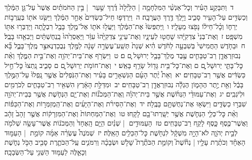 \documentclass[18pt]{article}
\newcommand{\kri}[1]{\Afootnote{#1}}	%
\begin{document}
 {\loc ד~}וַתִּבָּקַ֣ע הָעִ֗יר וְכׇל־אַנְשֵׁ֨י הַמִּלְחָמָ֤ה  |  הַלַּ֙יְלָה֙ דֶּ֜רֶךְ שַׁ֣עַר  |  בֵּ֣ין הַחֹמֹתַ֗יִם אֲשֶׁר֙ עַל־גַּ֣ן הַמֶּ֔לֶךְ וְכַשְׂדִּ֥ים עַל־הָעִ֖יר סָבִ֑יב וַיֵּ֖לֶךְ דֶּ֥רֶךְ הָעֲרָבָֽה׃ \startlock
 {\loc ה~}וַיִּרְדְּפ֤וּ חֵיל־כַּשְׂדִּים֙ אַחַ֣ר הַמֶּ֔לֶךְ וַיַּשִּׂ֥גוּ אֹת֖וֹ בְּעַֽרְב֣וֹת יְרֵח֑וֹ וְכׇ֨ל־חֵיל֔וֹ נָפֹ֖צוּ מֵעָלָֽיו׃ \startlock
 {\loc ו~}וַֽיִּתְפְּשׂוּ֙ אֶת־הַמֶּ֔לֶךְ וַיַּעֲל֥וּ אֹת֛וֹ אֶל־מֶ֥לֶךְ בָּבֶ֖ל רִבְלָ֑תָה וַיְדַבְּר֥וּ אִתּ֖וֹ מִשְׁפָּֽט׃ \startlock
 {\loc ז~}וְאֶת־בְּנֵי֙ צִדְקִיָּ֔הוּ שָׁחֲט֖וּ לְעֵינָ֑יו וְאֶת־עֵינֵ֤י צִדְקִיָּ֙הוּ֙ עִוֵּ֔ר וַיַּאַסְרֵ֙הוּ֙ בַֽנְחֻשְׁתַּ֔יִם וַיְבִאֵ֖הוּ בָּבֶֽל׃ \startlock
 {\loc ח~}וּבַחֹ֤דֶשׁ הַחֲמִישִׁי֙ בְּשִׁבְעָ֣ה לַחֹ֔דֶשׁ הִ֗יא שְׁנַת֙ תְּשַֽׁע־עֶשְׂרֵ֣ה שָׁנָ֔ה לַמֶּ֖לֶךְ נְבֻכַדְנֶאצַּ֣ר מֶֽלֶךְ־בָּבֶ֑ל בָּ֞א נְבוּזַרְאֲדָ֧ן רַב־טַבָּחִ֛ים עֶ֥בֶד מֶלֶךְ־בָּבֶ֖ל יְרוּשָׁל ָֽ͏ְם ם׃ \startlock
 {\loc ט~}וַיִּשְׂרֹ֥ף אֶת־בֵּית־יְהֹוָ֖ה וְאֶת־בֵּ֣ית הַמֶּ֑לֶךְ וְאֵ֨ת כׇּל־בָּתֵּ֧י יְרוּשָׁל ַ֛͏ְם ם וְאֶת־כׇּל־בֵּ֥ית גָּד֖וֹל שָׂרַ֥ף בָּאֵֽשׁ׃ \startlock
 {\loc י~}וְאֶת־חוֹמֹ֥ת יְרֽוּשָׁל ַ֖͏ְם ם סָבִ֑יב נָֽתְצוּ֙ כׇּל־חֵ֣יל כַּשְׂדִּ֔ים אֲשֶׁ֖ר רַב־טַבָּחִֽים׃ \startlock
 {\loc יא~}וְאֵת֩ יֶ֨תֶר הָעָ֜ם הַנִּשְׁאָרִ֣ים בָּעִ֗יר וְאֶת־הַנֹּֽפְלִים֙ אֲשֶׁ֤ר נָֽפְלוּ֙ עַל־הַמֶּ֣לֶךְ בָּבֶ֔ל וְאֵ֖ת יֶ֣תֶר הֶהָמ֑וֹן הֶגְלָ֕ה נְבוּזַרְאֲדָ֖ן רַב־טַבָּחִֽים׃ \startlock
 {\loc יב~}וּמִדַּלַּ֣ת הָאָ֔רֶץ הִשְׁאִ֖יר רַב־טַבָּחִ֑ים לְכֹרְמִ֖ים וּלְיֹגְבִֽים׃ \startlock
 {\loc יג~}וְאֶת־עַמּוּדֵ֨י הַנְּחֹ֜שֶׁת אֲשֶׁ֣ר בֵּית־יְהֹוָ֗ה וְֽאֶת־הַמְּכֹנ֞וֹת וְאֶת־יָ֧ם הַנְּחֹ֛שֶׁת אֲשֶׁ֥ר בְּבֵית־יְהֹוָ֖ה שִׁבְּר֣וּ כַשְׂדִּ֑ים וַיִּשְׂא֥וּ אֶת־נְחֻשְׁתָּ֖ם בָּבֶֽלָה׃ \startlock
 {\loc יד~}וְאֶת־הַסִּירֹ֨ת וְאֶת־הַיָּעִ֜ים וְאֶת־הַֽמְזַמְּר֣וֹת וְאֶת־הַכַּפּ֗וֹת וְאֵ֨ת כׇּל־כְּלֵ֧י הַנְּחֹ֛שֶׁת אֲשֶׁ֥ר יְשָֽׁרְתוּ־בָ֖ם לָקָֽחוּ׃ \startlock
 {\loc טו~}וְאֶת־הַמַּחְתּוֹת֙ וְאֶת־הַמִּזְרָק֔וֹת אֲשֶׁ֤ר זָהָב֙ זָהָ֔ב וַאֲשֶׁר־כֶּ֖סֶף כָּ֑סֶף לָקַ֖ח רַב־טַבָּחִֽים׃ \startlock
 {\loc טז~}הָעַמּוּדִ֣ים  |  שְׁנַ֗יִם הַיָּ֤ם הָֽאֶחָד֙ וְהַמְּכֹנ֔וֹת אֲשֶׁר־עָשָׂ֥ה שְׁלֹמֹ֖ה לְבֵ֣ית יְהֹוָ֑ה לֹא־הָיָ֣ה מִשְׁקָ֔ל לִנְחֹ֖שֶׁת כׇּל־הַכֵּלִ֥ים הָאֵֽלֶּה׃ \startlock
 {\loc יז~}שְׁמֹנֶה֩ עֶשְׂרֵ֨ה אַמָּ֜ה קוֹמַ֣ת  |  הָעַמּ֣וּד הָאֶחָ֗ד וְכֹתֶ֨רֶת עָלָ֥יו  |  נְחֹ֘שֶׁת֮ וְקוֹמַ֣ת הַכֹּתֶ֘רֶת֮ שָׁלֹ֣שׁ  \edtext{(אמה)}{\kri{קרי: אַמּוֹת֒}}  וּשְׂבָכָ֨ה וְרִמֹּנִ֧ים עַֽל־הַכֹּתֶ֛רֶת סָבִ֖יב הַכֹּ֣ל נְחֹ֑שֶׁת וְכָאֵ֛לֶּה לַעַמּ֥וּד הַשֵּׁנִ֖י עַל־הַשְּׂבָכָֽה׃ \startlock
\end{document}
